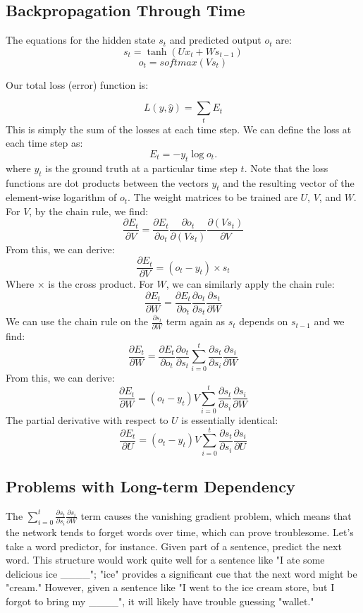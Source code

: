 \documentclass{article}
\begin{document}
    \subsection{Backpropagation Through Time}
     The equations for the hidden state $s_t$ and predicted output $o_t$ are:
    \[ s_t=\tanh(U x_t+W s_{t-1}) \] 
    \[ o_t= softmax(V s_t) \]
    
    \noindent Our total loss (error) function is:
    
    \begin{equation}
    \label{loss}
    L(y,\hat{y})=\sum_{t} E_t
    \end{equation}
    \noindent This is simply the sum of the losses at each time step. We can define the loss at each time step as:
    \begin{equation}
    \label{oneloss}
    E_t=-y_t\log o_t.
    \end{equation}
    \noindent where $y_t$ is the ground truth at a particular time step $t$.
    \noindent Note that the loss functions are dot products between the vectors $y_t$ and the resulting vector of the element-wise logarithm of $o_t$. 
    \noindent The weight matrices to be trained are $U$, $V$, and $W$. For $V$, by the chain rule, we find:
    \[ \frac{\partial E_t}{\partial V} = \frac{\partial E_t}{\partial o_t}\frac{\partial o_t}{\partial (V s_t)}\frac{\partial (V s_t)}{\partial V} \]
    From this, we can derive:
    \[ \frac{\partial E_t}{\partial V} = (o_t - y_t) \times s_t \]
    Where $\times$ is the cross product.
    For $W$, we can similarly apply the chain rule:
    \[ \frac{\partial E_t}{\partial W} = \frac{\partial E_t}{\partial o_t}\frac{\partial o_t}{\partial s_t}\frac{\partial s_t}{\partial W} \]
    We can use the chain rule on the $\frac{\partial s_t}{\partial W}$ term again as $s_t$ depends on $s_{t-1}$ and we find:
    \[ \frac{\partial E_t}{\partial W} = \frac{\partial E_t}{\partial o_t}\frac{\partial o_t}{\partial s_t}\sum_{i=0}^t \frac{\partial s_t}{\partial s_i}\frac{\partial s_i}{\partial W} \]
    From this, we can derive:
    \[ \frac{\partial E_t}{\partial W} = (o_t - y_t)V\sum_{i=0}^t \frac{\partial s_t}{\partial s_i}\frac{\partial s_i}{\partial W} \]
    The partial derivative with respect to $U$ is essentially identical:
     \[ \frac{\partial E_t}{\partial U} = (o_t - y_t)V\sum_{i=0}^t \frac{\partial s_t}{\partial s_i}\frac{\partial s_i}{\partial U} \]   
    \subsection{Problems with Long-term Dependency}
    The $\sum_{i=0}^t \frac{\partial s_t}{\partial s_i}\frac{\partial s_i}{\partial W}$ term causes the vanishing gradient problem, which means that the network tends to forget words over time, which can prove troublesome. Let's take a word predictor, for instance. Given part of a sentence, predict the next word. This structure would work quite well for a sentence like "I ate some delicious ice \_\_\_\_"; "ice" provides a significant cue that the next word might be "cream." However, given a sentence like "I went to the ice cream store, but I forgot to bring my \_\_\_\_", it will likely have trouble guessing "wallet." 
\end{document}
